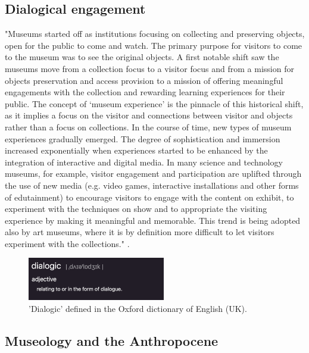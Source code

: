 \subsection{Dialogical engagement}
"Museums started off as institutions focusing on collecting and preserving objects, open for the public to come and watch. The primary purpose for visitors to come to the museum was to see the original objects. A first notable shift saw the museums move from a collection focus to a visitor focus and from a mission for objects preservation and access provision to a mission of offering meaningful engagements with the collection and rewarding learning experiences for their public. The concept of ‘museum experience’ is the pinnacle of this historical shift, as it implies a focus on the visitor and connections between visitor and objects rather than a focus on collections. In the course of time, new types of museum experiences gradually emerged. The degree of sophistication and immersion increased exponentially when experiences started to be enhanced by the integration of interactive and digital media. In many science and technology museums, for example, visitor engagement and participation are uplifted through the use of new media (e.g. video games, interactive installations and other forms of edutainment) to encourage visitors to engage with the content on exhibit, to experiment with the techniques on show and to appropriate the visiting experience by making it meaningful and memorable. This trend is being adopted also by art museums, where it is by definition more difficult to let visitors experiment with the collections." \autocite[p. 3]{vermeeren_museum_2018}.

\begin{figure}[H]
\includegraphics[width=6cm]{pictures/background/dialogic.png}
\caption{'Dialogic' defined in the Oxford dictionary of English (UK).}
\centering
\end{figure}

\subsection{Museology and the Anthropocene}

